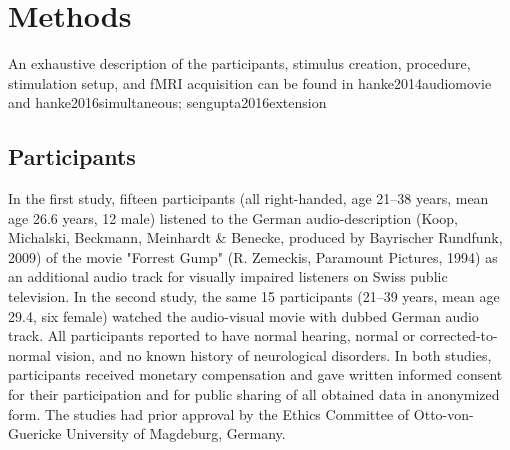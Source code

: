 \documentclass[english]{article}
\begin{document}

\section{Methods}
An exhaustive description of the participants, stimulus creation, procedure, stimulation setup, and fMRI acquisition can be found in {hanke2014audiomovie} and {hanke2016simultaneous; sengupta2016extension} 



\subsection{Participants}
In the first  study, fifteen participants (all right-handed, age 21–38 years, mean age 26.6 years, 12 male) listened to the German audio-description (Koop, Michalski, Beckmann, Meinhardt \& Benecke, produced by Bayrischer Rundfunk, 2009) of the movie "Forrest Gump" (R. Zemeckis, Paramount Pictures, 1994) as an additional audio track for visually impaired listeners on Swiss public television. In the second study, the same 15 participants (21–39 years, mean age 29.4, six female) watched the audio-visual movie with dubbed German audio track. All participants reported to have normal hearing, normal or corrected-to-normal vision, and no known history of neurological disorders. In both studies, participants received monetary compensation and gave written informed consent for their participation and for public sharing of all obtained data in anonymized form. The studies had prior approval by the Ethics Committee of Otto-von-Guericke University of Magdeburg, Germany.
\end{document}
